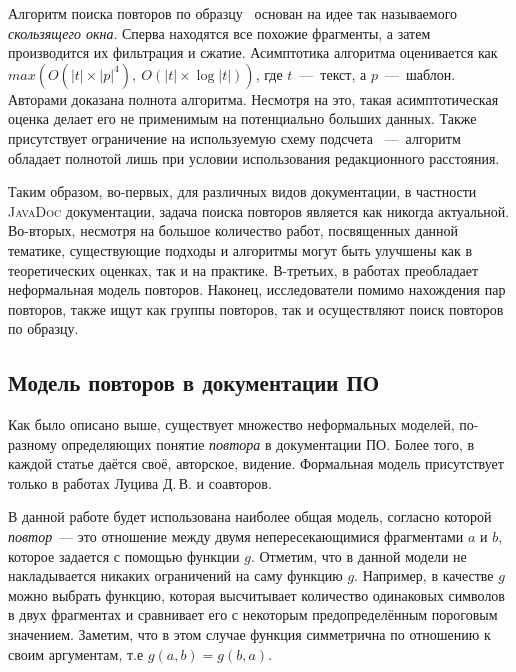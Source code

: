 Алгоритм поиска повторов по образцу~\cite{luciv2019interactive} основан на идее так называемого \emph{скользящего окна}.
Сперва находятся все похожие фрагменты, а затем производится их фильтрация и сжатие.
Асимптотика алгоритма оценивается как $max(O(|t|\times|p|^4),\ O(|t|\times \log |t|))$, где $t$~---~текст, а $p$~---~шаблон.
Авторами доказана полнота алгоритма.
Несмотря на это, такая асимптотическая оценка делает его не применимым на потенциально больших данных.
Также присутствует ограничение на используемую схему подсчета ~---~алгоритм обладает полнотой лишь при условии использования редакционного расстояния.

Таким образом, во-первых, для различных видов документации, в частности \textsc{JavaDoc} документации, задача поиска повторов является как никогда актуальной.
Во-вторых, несмотря на большое количество работ, посвященных  данной тематике, существующие подходы и алгоритмы могут быть улучшены как в теоретических оценках, так и на практике.
В-третьих, в работах преобладает неформальная модель повторов.
Наконец, исследователи помимо нахождения пар повторов, также ищут как группы повторов, так и осуществляют поиск повторов по образцу.


\subsection{Модель повторов в документации ПО}\label{Model}
Как было описано выше, существует множество неформальных моделей, по-разному определяющих понятие \emph{повтора} в документации ПО.
Более того, в каждой статье даётся своё, авторское, видение.
Формальная  модель присутствует только в работах Луцива Д.\,В. и соавторов.

В данной работе будет использована наиболее общая модель, согласно которой \emph{повтор}~--- это отношение между двумя непересекающимися фрагментами $a$ и $b$, которое задается с помощью функции  $g$.
Отметим, что в данной модели не накладывается никаких ограничений на саму функцию  $g$.
Например, в качестве $g$ можно выбрать функцию, которая высчитывает количество одинаковых символов в двух фрагментах и сравнивает его с некоторым предопределённым пороговым значением. %
Заметим, что в этом случае функция симметрична по отношению к своим аргументам, т.е $g(a,b) = g(b,a)$.

